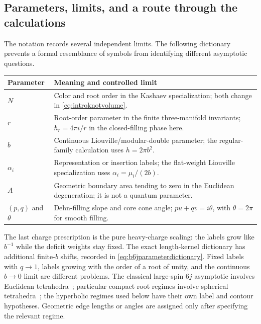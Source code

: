 \subsection{Parameters, limits, and a route through the calculations}
\label{sec:introreadingguide}

The notation records several independent limits. The following
dictionary prevents a formal resemblance of symbols from
identifying different asymptotic questions.
\begin{center}
\small
\begin{tabular}{@{}>{\raggedright\arraybackslash}p{}>{\raggedright\arraybackslash}p{}@{}}
\toprule
Parameter & Meaning and controlled limit\\
\midrule
$N$ & Color and root order in the Kashaev specialization;
both change in \eqref{eq:introknotvolume}.\\[4pt]
$r$ & Root-order parameter in the finite three-manifold
invariants; $\hbar_r=4\pi i/r$ in the closed-filling phase here.\\[4pt]
$b$ & Continuous Liouville/modular-double parameter;
the regular-family calculation uses $h=2\pi b^2$.\\[4pt]
$\alpha_i$ & Representation or insertion labels; the flat-weight
Liouville specialization uses $\alpha_i=\mu_i/(2b)$.\\[4pt]
$A$ & Geometric boundary area tending to zero in the
Euclidean degeneration; it is not a quantum parameter.\\[4pt]
$(p,q)$ and $\theta$ & Dehn-filling slope and core cone angle;
$pu+qv=i\theta$, with $\theta=2\pi$ for smooth filling.\\
\bottomrule
\end{tabular}
\end{center}
The last charge prescription is the pure heavy-charge scaling:
the labels grow like $b^{-1}$ while the deficit weights stay fixed.
The exact length-kernel dictionary has additional finite-$b$
shifts, recorded in \eqref{eq:b6jparameterdictionary}.
Fixed labels with $q\to1$, labels growing with the order of a root
of unity, and the continuous $b\to0$ limit are different problems.
The classical large-spin $6j$ asymptotic involves Euclidean
tetrahedra~\cite{Roberts}; particular compact root regimes involve
spherical tetrahedra~\cite{TaylorWoodward}; the hyperbolic regimes
used below have their own label and contour hypotheses. Geometric
edge lengths or angles are assigned only after specifying the
relevant regime.

